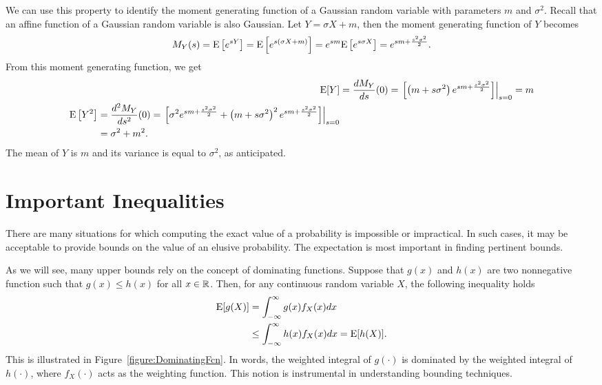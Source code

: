 \begin{example}
We can use this property to identify the moment generating function of a Gaussian random variable with parameters $m$ and $\sigma^2$.
Recall that an affine function of a Gaussian random variable is also Gaussian.
Let $Y = \sigma X + m$, then the moment generating function of $Y$ becomes
\begin{equation*}
M_Y (s) = \mathrm{E} \left[ e^{sY} \right]
= \mathrm{E} \left[ e^{s(\sigma X + m)} \right]
= e^{sm} \mathrm{E} \left[ e^{s\sigma X} \right]
= e^{sm + \frac{s^2 \sigma^2}{2} } .
\end{equation*}
From this moment generating function, we get
\begin{align*}
\mathrm{E} [Y] &= \frac{d M_Y}{ds} (0)
= \left. \left[ \left(m + s \sigma^2 \right)
e^{sm + \frac{s^2 \sigma^2}{2} } \right] \right|_{s=0} = m \\
\begin{split}
\mathrm{E} \left[ Y^2 \right] &= \frac{d^2 M_Y}{ds^2} (0)
= \left.  \left[ \sigma^2 e^{sm + \frac{s^2 \sigma^2}{2} }
+ \left(m + s \sigma^2 \right)^2  e^{sm + \frac{s^2 \sigma^2}{2} } \right]
\right|_{s=0} \\
&= \sigma^2 + m^2 .
\end{split}
\end{align*}
The mean of $Y$ is $m$ and its variance is equal to $\sigma^2$, as anticipated.
\end{example}


\section{Important Inequalities}

There are many situations for which computing the exact value of a probability is impossible or impractical.
In such cases, it may be acceptable to provide bounds on the value of an elusive probability.
The expectation is most important in finding pertinent bounds.

As we will see, many upper bounds rely on the concept of dominating functions.
Suppose that $g(x)$ and $h(x)$ are two nonnegative function such that $g(x) \leq h(x)$ for all $x \in \mathbb{R}$.
Then, for any continuous random variable $X$, the following inequality holds
\begin{equation*}
\begin{split}
\mathrm{E} [g(X)] &= \int_{-\infty}^{\infty} g(x) f_X(x) dx \\
&\leq \int_{-\infty}^{\infty} h(x) f_X (x) dx
= \mathrm{E} [h(X)] .
\end{split}
\end{equation*}
This is illustrated in Figure~\ref{figure:DominatingFcn}.
In words, the weighted integral of $g(\cdot)$ is dominated by the weighted integral of $h(\cdot)$, where $f_X (\cdot)$ acts as the weighting function.
This notion is instrumental in understanding bounding techniques.

